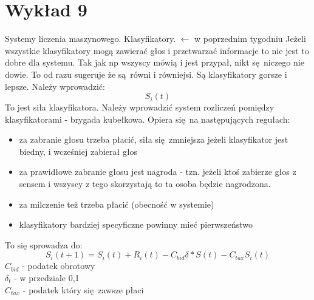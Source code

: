 \documentclass{article}
\begin{document}
		\section{Wykład 9}
		
		Systemy liczenia maszynowego. Klasyfikatory. $\leftarrow$ w poprzednim tygodniu
		Jeżeli wszystkie klasyfikatory mogą zawierać głos i przetwarzać informacje to nie jest to dobre dla systemu. Tak jak np wszyscy mówią i jest przypał, nikt sę niczego nie dowie. To od razu sugeruje że są równi i równiejsi. Są klasyfikatory gorsze i lepsze. Należy wprowadzić:
		$$S_i(t)$$
		To jest siła klasyfikatora. Należy wprowadzić system rozliczeń pomiędzy klasyfikatorami - brygada kubełkowa. Opiera się na następujących regułach:
		\begin{itemize}
			\item za zabranie głosu trzeba płacić, siła się zmniejsza jeżeli klasyfikator jest biedny, i wcześniej zabierał głos
			\item za prawidłowe zabranie głosu jest nagroda - tzn. jeżeli ktoś zabierze głos z sensem i wszyscy z tego skorzystają to ta osoba będzie nagrodzona.
			\item za milczenie też trzeba płacić (obecność w systemie)
			\item klasyfikatory bardziej specyficzne powinny mieć pierwszeństwo
		\end{itemize}
		To się sprowadza do:
		$$S_i(t+1)=S_i(t)+R_i(t)-C_{bid}\delta*S(t)-C_{tax}S_i(t)$$
		$C_{bid}$ - podatek obrotowy \\
		$\delta _t$ - w przedziale {0,1} \\
		$C_{tax}$ - podatek który się zawsze płaci \\
		\paragraph{}
		
\end{document}
